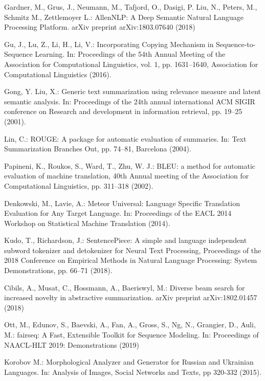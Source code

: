 \documentclass[runningheads]{llncs}
\begin{document}
\begin{thebibliography}{8}
Gardner, M., Grus, J., Neumann, M., Tafjord, O., Dasigi, P. Liu, N., Peters, M., Schmitz M., Zettlemoyer L.: AllenNLP: A Deep Semantic Natural Language Processing Platform. arXiv preprint arXiv:1803.07640 (2018)

Gu, J., Lu, Z., Li, H., Li, V.: Incorporating Copying Mechanism in Sequence-to-Sequence Learning. In: Proceedings of the 54th Annual Meeting of the Association for Computational Linguistics, vol. 1, pp. 1631–1640, Association for Computational Linguistics (2016).

Gong, Y. Liu, X.: Generic text summarization using relevance measure and latent semantic analysis. In: Proceedings of the 24th annual international ACM SIGIR conference on Research and development in information retrieval, pp. 19–25 (2001).

Lin, C.: ROUGE: A package for automatic evaluation of summaries. In: Text Summarization Branches Out, pp. 74–81, Barcelona (2004).

Papineni, K., Roukos, S., Ward, T., Zhu, W. J.: BLEU: a method for automatic evaluation of machine translation, 40th Annual meeting of the Association for Computational Linguistics, pp. 311–318 (2002).

Denkowski, M., Lavie, A.: Meteor Universal: Language Specific Translation Evaluation for Any Target Language. In: Proceedings of the EACL 2014 Workshop on Statistical Machine Translation (2014).

Kudo, T., Richardson, J.: SentencePiece: A simple and language independent subword tokenizer and detokenizer for Neural Text Processing, Proceedings of the 2018 Conference on Empirical Methods in Natural Language Processing: System Demonstrations, pp. 66–71 (2018).

Cibils, A., Musat, C., Hossmann, A., Baeriswyl, M.: Diverse beam search for increased novelty in abstractive summarization. arXiv preprint arXiv:1802.01457 (2018)

Ott, M., Edunov, S., Baevski, A., Fan, A., Gross, S., Ng, N., Grangier, D., Auli, M.: fairseq: A Fast, Extensible Toolkit for Sequence Modeling. In: Proceedings of NAACL-HLT 2019: Demonstrations (2019)

Korobov M.: Morphological Analyzer and Generator for Russian and Ukrainian Languages. In: Analysis of Images, Social Networks and Texts, pp 320-332 (2015).

\end{thebibliography}
\end{document}
